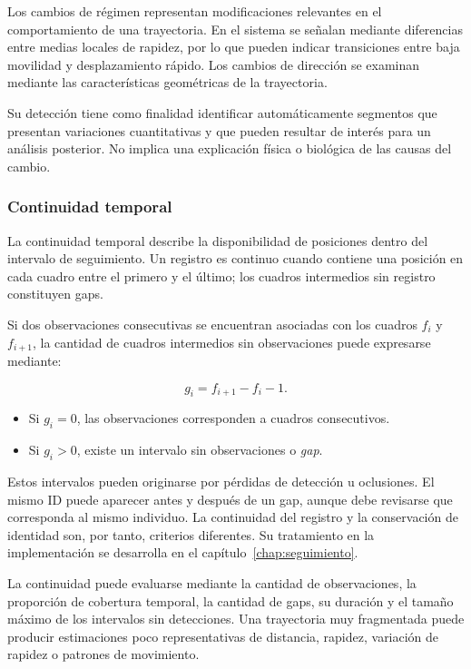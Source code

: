 Los cambios de régimen representan modificaciones relevantes en el comportamiento de una trayectoria. En el sistema se señalan mediante diferencias entre medias locales de rapidez, por lo que pueden indicar transiciones entre baja movilidad y desplazamiento rápido. Los cambios de dirección se examinan mediante las características geométricas de la trayectoria.

Su detección tiene como finalidad identificar automáticamente segmentos que presentan variaciones cuantitativas y que pueden resultar de interés para un análisis posterior. No implica una explicación física o biológica de las causas del cambio.

\subsubsection{Continuidad temporal}

La continuidad temporal describe la disponibilidad de posiciones dentro del intervalo de seguimiento. Un registro es continuo cuando contiene una posición en cada cuadro entre el primero y el último; los cuadros intermedios sin registro constituyen gaps.

Si dos observaciones consecutivas se encuentran asociadas con los cuadros $f_i$ y $f_{i+1}$, la cantidad de cuadros intermedios sin observaciones puede expresarse mediante:

\[
g_i=f_{i+1}-f_i-1.
\]

\begin{itemize}
  \item Si $g_i=0$, las observaciones corresponden a cuadros consecutivos.
  \item Si $g_i>0$, existe un intervalo sin observaciones o \textit{gap}.
\end{itemize}

Estos intervalos pueden originarse por pérdidas de detección u oclusiones. El mismo ID puede aparecer antes y después de un gap, aunque debe revisarse que corresponda al mismo individuo. La continuidad del registro y la conservación de identidad son, por tanto, criterios diferentes. Su tratamiento en la implementación se desarrolla en el capítulo~\ref{chap:seguimiento}.

La continuidad puede evaluarse mediante la cantidad de observaciones, la proporción de cobertura temporal, la cantidad de gaps, su duración y el tamaño máximo de los intervalos sin detecciones. Una trayectoria muy fragmentada puede producir estimaciones poco representativas de distancia, rapidez, variación de rapidez o patrones de movimiento.

